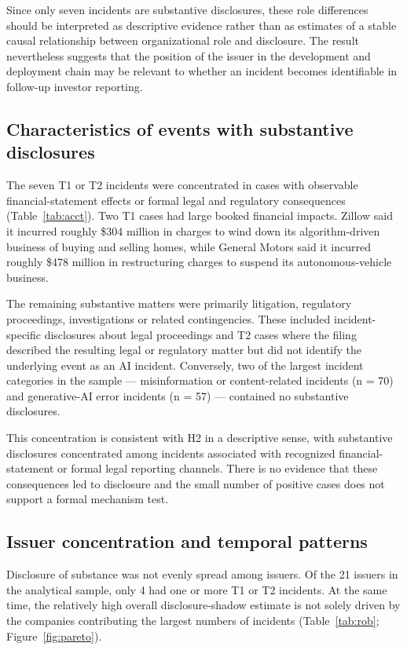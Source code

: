 \documentclass[utf8]{FrontiersinHarvard}
\begin{document}
Since only seven incidents are substantive disclosures, these role differences should be interpreted as descriptive evidence rather than as estimates of a stable causal relationship between organizational role and disclosure. The result nevertheless suggests that the position of the issuer in the development and deployment chain may be relevant to whether an incident becomes identifiable in follow-up investor reporting.

\subsection{Characteristics of events with substantive disclosures}
The seven T1 or T2 incidents were concentrated in cases with observable financial-statement effects or formal legal and regulatory consequences (Table~\ref{tab:acct}). Two T1 cases had large booked financial impacts. Zillow said it incurred roughly \$304 million in charges to wind down its algorithm-driven business of buying and selling homes, while General Motors said it incurred roughly \$478 million in restructuring charges to suspend its autonomous-vehicle business.

The remaining substantive matters were primarily litigation, regulatory proceedings, investigations or related contingencies. These included incident-specific disclosures about legal proceedings and T2 cases where the filing described the resulting legal or regulatory matter but did not identify the underlying event as an AI incident. Conversely, two of the largest incident categories in the sample --- misinformation or content-related incidents (n = 70) and generative-AI error incidents (n = 57) --- contained no substantive disclosures.

This concentration is consistent with H2 in a descriptive sense, with substantive disclosures concentrated among incidents associated with recognized financial-statement or formal legal reporting channels. There is no evidence that these consequences led to disclosure and the small number of positive cases does not support a formal mechanism test.

\subsection{Issuer concentration and temporal patterns}
Disclosure of substance was not evenly spread among issuers. Of the 21 issuers in the analytical sample, only 4 had one or more T1 or T2 incidents. At the same time, the relatively high overall disclosure-shadow estimate is not solely driven by the companies contributing the largest numbers of incidents (Table~\ref{tab:rob}; Figure~\ref{fig:pareto}).
\end{document}
